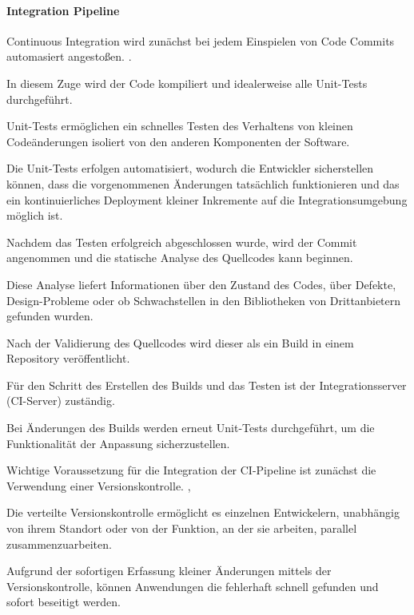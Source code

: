 \paragraph{Integration Pipeline} 

Continuous Integration wird zunächst bei jedem Einspielen von Code Commits automasiert angestoßen. \cite[S. 266]{tokarski_strategische_2018}. 

In diesem Zuge wird der Code kompiliert und idealerweise alle Unit-Tests durchgeführt.  

Unit-Tests ermöglichen ein schnelles Testen des Verhaltens von kleinen Codeänderungen isoliert von den anderen Komponenten der Software. \cite[S. 60]{humble_continuous_2011} 

Die Unit-Tests erfolgen automatisiert, wodurch die Entwickler sicherstellen können, dass die vorgenommenen Änderungen tatsächlich funktionieren und das ein kontinuierliches Deployment kleiner Inkremente auf die Integrationsumgebung möglich ist.

Nachdem das Testen erfolgreich abgeschlossen wurde, wird der Commit angenommen und die statische Analyse des Quellcodes kann beginnen. \cite[S. 61]{verona_practical_2016} 

Diese Analyse liefert Informationen über den Zustand des Codes, über Defekte, Design-Probleme oder ob Schwachstellen in den Bibliotheken von Drittanbietern gefunden wurden. \cite[S. 61]{verona_practical_2016} 

Nach der Validierung des Quellcodes wird dieser als ein Build in einem Repository veröffentlicht.

Für den Schritt des Erstellen des Builds und das Testen ist der Integrationsserver (CI-Server) zuständig. 

Bei Änderungen des Builds werden erneut Unit-Tests durchgeführt, um die Funktionalität der Anpassung sicherzustellen. \cite[S. 57]{forsgren_mindset_2019} 

Wichtige Voraussetzung für die Integration der CI-Pipeline ist zunächst die Verwendung einer Versionskontrolle. \cite[S. 100 - 101]{bass_devops_2015}, \cite[S. 57]{forsgren_mindset_2019} 

Die verteilte Versionskontrolle ermöglicht es einzelnen Entwickelern, unabhängig von ihrem Standort oder von der Funktion, an der sie arbeiten, parallel zusammenzuarbeiten.

Aufgrund der sofortigen Erfassung kleiner Änderungen mittels der Versionskontrolle, können Anwendungen die fehlerhaft schnell gefunden und sofort beseitigt werden. \cite[S. 57]{humble_continuous_2011}

